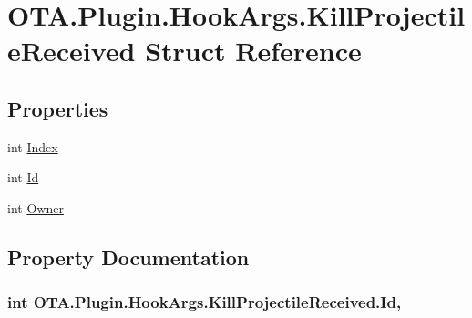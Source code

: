 \hypertarget{struct_o_t_a_1_1_plugin_1_1_hook_args_1_1_kill_projectile_received}{}\section{O\+T\+A.\+Plugin.\+Hook\+Args.\+Kill\+Projectile\+Received Struct Reference}
\label{struct_o_t_a_1_1_plugin_1_1_hook_args_1_1_kill_projectile_received}
\subsection*{Properties}
\begin{DoxyCompactItemize}
\item 
int \hyperlink{struct_o_t_a_1_1_plugin_1_1_hook_args_1_1_kill_projectile_received_a89c5bcd1ff4744bdade9b7d86b17e628}{Index}
\item 
int \hyperlink{struct_o_t_a_1_1_plugin_1_1_hook_args_1_1_kill_projectile_received_af72c29e422d7a6e08318ee6519275b6c}{Id}
\item 
int \hyperlink{struct_o_t_a_1_1_plugin_1_1_hook_args_1_1_kill_projectile_received_acdb96a38df6c884769f68fec224d7b55}{Owner}
\end{DoxyCompactItemize}


\subsection{Property Documentation}
\hypertarget{struct_o_t_a_1_1_plugin_1_1_hook_args_1_1_kill_projectile_received_af72c29e422d7a6e08318ee6519275b6c}{}
\subsubsection[{Id}]{\setlength{\rightskip}{0pt plus 5cm}int O\+T\+A.\+Plugin.\+Hook\+Args.\+Kill\+Projectile\+Received.\+Id\hspace{0.3cm}{\ttfamily [get]}, {\ttfamily [set]}}\label{struct_o_t_a_1_1_plugin_1_1_hook_args_1_1_kill_projectile_received_af72c29e422d7a6e08318ee6519275b6c}
\hypertarget{struct_o_t_a_1_1_plugin_1_1_hook_args_1_1_kill_projectile_received_a89c5bcd1ff4744bdade9b7d86b17e628}{}
